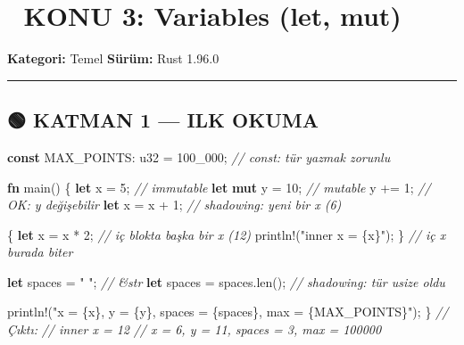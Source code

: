 \documentclass[12pt,a4paper]{article}
\newenvironment{Shaded}{}{}
\newcommand{\CommentTok}[1]{\textcolor[rgb]{0.38,0.63,0.69}{\textit{#1}}}
\newcommand{\DataTypeTok}[1]{\textcolor[rgb]{0.56,0.13,0.00}{#1}}
\newcommand{\DecValTok}[1]{\textcolor[rgb]{0.25,0.63,0.44}{#1}}
\newcommand{\FunctionTok}[1]{\textcolor[rgb]{0.02,0.16,0.49}{#1}}
\newcommand{\KeywordTok}[1]{\textcolor[rgb]{0.00,0.44,0.13}{\textbf{#1}}}
\newcommand{\NormalTok}[1]{#1}
\newcommand{\OperatorTok}[1]{\textcolor[rgb]{0.40,0.40,0.40}{#1}}
\newcommand{\StringTok}[1]{\textcolor[rgb]{0.25,0.44,0.63}{#1}}
\begin{document}
\section{📘 KONU 3: Variables (let, mut)}\label{konu-3-variables-let-mut}

\textbf{Kategori:} Temel \textbar{} \textbf{Sürüm:} Rust 1.96.0

\begin{center}\rule{0.5\linewidth}{0.5pt}\end{center}

\subsection{🟢 KATMAN 1 --- ILK OKUMA}\label{katman-1-—-ilk-okuma-2}

\begin{Shaded}
\begin{Highlighting}[]
\KeywordTok{const}\NormalTok{ MAX\_POINTS}\OperatorTok{:} \DataTypeTok{u32} \OperatorTok{=} \DecValTok{100\_}\DecValTok{000}\OperatorTok{;}      \CommentTok{// const: tür yazmak zorunlu}

\KeywordTok{fn} \FunctionTok{main}\OperatorTok{()} \OperatorTok{\{}
    \KeywordTok{let}\NormalTok{ x }\OperatorTok{=} \DecValTok{5}\OperatorTok{;}                        \CommentTok{// immutable}
    \KeywordTok{let} \KeywordTok{mut}\NormalTok{ y }\OperatorTok{=} \DecValTok{10}\OperatorTok{;}                   \CommentTok{// mutable}
\NormalTok{    y }\OperatorTok{+=} \DecValTok{1}\OperatorTok{;}                           \CommentTok{// OK: y değişebilir}
    \KeywordTok{let}\NormalTok{ x }\OperatorTok{=}\NormalTok{ x }\OperatorTok{+} \DecValTok{1}\OperatorTok{;}                    \CommentTok{// shadowing: yeni bir x (6)}

    \OperatorTok{\{}
        \KeywordTok{let}\NormalTok{ x }\OperatorTok{=}\NormalTok{ x }\OperatorTok{*} \DecValTok{2}\OperatorTok{;}                \CommentTok{// iç blokta başka bir x (12)}
\NormalTok{        println}\OperatorTok{!(}\StringTok{"inner x = \{x\}"}\OperatorTok{);}
    \OperatorTok{\}}                                 \CommentTok{// iç x burada biter}

    \KeywordTok{let}\NormalTok{ spaces }\OperatorTok{=} \StringTok{"   "}\OperatorTok{;}               \CommentTok{// \&str}
    \KeywordTok{let}\NormalTok{ spaces }\OperatorTok{=}\NormalTok{ spaces}\OperatorTok{.}\FunctionTok{len}\OperatorTok{();}        \CommentTok{// shadowing: tür usize oldu}

\NormalTok{    println}\OperatorTok{!(}\StringTok{"x = \{x\}, y = \{y\}, spaces = \{spaces\}, max = \{MAX\_POINTS\}"}\OperatorTok{);}
\OperatorTok{\}}
\CommentTok{// Çıktı:}
\CommentTok{// inner x = 12}
\CommentTok{// x = 6, y = 11, spaces = 3, max = 100000}
\end{Highlighting}
\end{Shaded}
\end{document}
